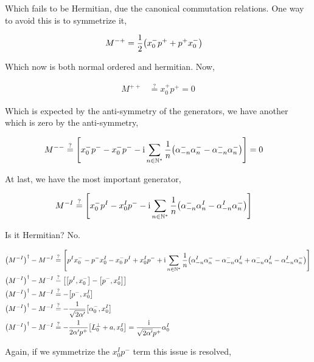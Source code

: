 Which fails to be Hermitian, due the canonical commutation relations. One way to avoid this is to symmetrize it,

\begin{align*}
    M^{-+}&=\frac{1}{2}\qty(x_0^-p^++p^+x_0^-)
\end{align*}

Which now is both normal ordered and hermitian. Now,

\begin{align*}
    M^{++}&\stackrel{?}{=}x_0^+p^+=0
\end{align*}

Which is expected by the anti-symmetry of the generators, we have another which is zero by the anti-symmetry,

\begin{align*}
    M^{--}&\stackrel{?}{=}\qty[x_0^-p^--x_0^-p^--\textnormal{i}\sum\limits_{n\in\mathbb N^\ast}\frac1n\qty(\alpha_{-n}^-\alpha^-_{n}-\alpha^-_{-n}\alpha^-_n)]=0
\end{align*}

At last, we have the most important generator,

\begin{align*}
    M^{-I}&\stackrel{?}{=}\left[x_0^- p^I-x_0^I p^--\textnormal{i}\sum\limits_{n\in\mathbb N^\ast}\frac{1}{n}\qty(\alpha^-_{-n}\alpha^I_{n}-\alpha^I_{-n}\alpha^-_{n})\right]
\end{align*}

Is it Hermitian? No. 

\begin{align*}
    \qty(M^{-I})^\dagger-M^{-I}&\stackrel{?}{=}\left[p^Ix_0^- -p^-x_0^I -x_0^- p^I+x_0^I p^-+\im\sum\limits_{n\in\mathbb N^\ast}\frac{1}{n}\qty(\alpha^I_{-n}\alpha^-_{n}-\alpha^-_{-n}\alpha^I_{n}+\alpha^-_{-n}\alpha^I_{n}-\alpha^I_{-n}\alpha^-_{n})\right]\\
    \qty(M^{-I})^\dagger-M^{-I}&\stackrel{?}{=}\left[\comm{p^I}{x_0^-} -\comm{p^-}{x_0^I}\right]\\
    \qty(M^{-I})^\dagger-M^{-I}&\stackrel{?}{=}-\comm{p^-}{x_0^I}\\
    \qty(M^{-I})^\dagger-M^{-I}&\stackrel{?}{=}-\frac{1}{\sqrt{2\alpha'}}\comm{\alpha_0^-}{x_0^I}\\
    \qty(M^{-I})^\dagger-M^{-I}&\stackrel{?}{=}-\frac{1}{2\alpha'p^+}\comm{L^\perp_0+a}{x_0^I}=\frac{\im}{\sqrt{2\alpha'}p^+}\alpha^I_0
\end{align*}

Again, if we symmetrize the $x_0^Ip^-$ term this issue is resolved,

